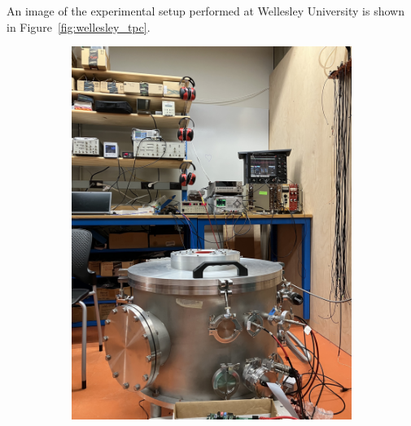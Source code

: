 An image of the experimental setup performed at Wellesley University is shown in Figure~\ref{fig:wellesley_tpc}.

\begin{figure}[]
\centering
\begin{subfigure}{.5\textwidth}
  \centering
  \includegraphics[width=\textwidth]{images/saq_wellesley_tpc.jpg}
  \caption{}
\end{subfigure}%
\begin{subfigure}{.5\textwidth}
  \centering

\end{subfigure}
\end{figure}
